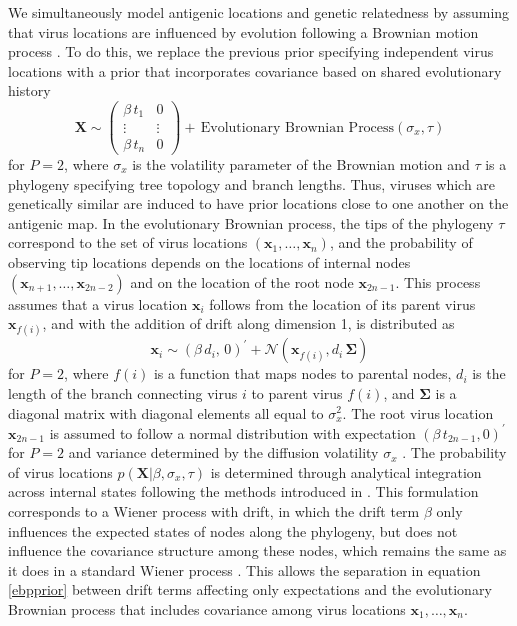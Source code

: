 \documentclass[11pt,oneside,letterpaper]{article}
\newcommand{\virus}{\mathbf{x}}						%
\newcommand{\viruses}{\mathbf{X}}					%
\newcommand{\virussd}{\sigma_x}						%
\newcommand{\tree}{\tau}							%
\newcommand{\vn}{n}									%
\newcommand{\normal}{\mathcal{N}}					%
\begin{document}
We simultaneously model antigenic locations and genetic relatedness by assuming that virus locations are influenced by evolution following a Brownian motion process \cite{Lemey10}.
To do this, we replace the previous prior specifying independent virus locations with a prior that incorporates covariance based on shared evolutionary history
\begin{equation} \label{ebpprior}
	\viruses \sim \left( \begin{matrix} \beta \, t_1 & 0 \\ \vdots & \vdots \\ \beta \, t_n & 0 \end{matrix} \right) + \, \mbox{Evolutionary Brownian Process}(\virussd, \tree)
\end{equation}
for $P=2$, where $\virussd$ is the volatility parameter of the Brownian motion and $\tree$ is a phylogeny specifying tree topology and branch lengths.
Thus, viruses which are genetically similar are induced to have prior locations close to one another on the antigenic map.
In the evolutionary Brownian process, the tips of the phylogeny $\tree$ correspond to the set of virus locations $(\virus_1, \ldots, \virus_\vn)$, and the probability of observing tip locations depends on the locations of internal nodes $(\virus_{n+1}, \ldots, \virus_{2\vn-2})$ and on the location of the root node $\virus_{2\vn-1}$.
This process assumes that a virus location $\virus_i$ follows from the location of its parent virus $\virus_{f(i)}$, and with the addition of drift along dimension 1, is distributed as
\begin{equation} 
	\virus_i \sim (\beta \, d_i, \, 0)^{\prime} + \normal(\virus_{f(i)}, d_i \, \boldsymbol{\Sigma})
\end{equation}
for $P=2$, where $f(i)$ is a function that maps nodes to parental nodes, $d_i$ is the length of the branch connecting virus $i$ to parent virus $f(i)$, and $\boldsymbol{\Sigma}$ is a diagonal matrix with diagonal elements all equal to $\virussd^2$.
The root virus location $\virus_{2\vn-1}$ is assumed to follow a normal distribution with expectation $(\beta \, t_{2\vn-1}, 0)^{\prime}$ for $P=2$ and variance determined by the diffusion volatility $\virussd$ \cite{Lemey10}.
The probability of virus locations $p(\viruses | \beta, \virussd, \tree)$ is determined through analytical integration across internal states following the methods introduced in \cite{Lemey10}.
This formulation corresponds to a Wiener process with drift, in which the drift term $\beta$ only influences the expected states of nodes along the phylogeny, but does not influence the covariance structure among these nodes, which remains the same as it does in a standard Wiener process \cite{BrownianMotionHandbook}.
This allows the separation in equation \ref{ebpprior} between drift terms affecting only expectations and the evolutionary Brownian process that includes covariance among virus locations $\virus_1,\ldots,\virus_n$.
\end{document}
